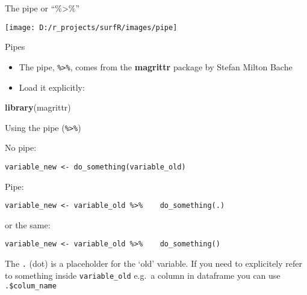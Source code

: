 \documentclass[ignorenonframetext,]{beamer}
\newenvironment{Shaded}{\begin{snugshade}}{\end{snugshade}}
\newcommand{\KeywordTok}[1]{\textcolor[rgb]{0.13,0.29,0.53}{\textbf{#1}}}
\newcommand{\NormalTok}[1]{#1}
\providecommand{\tightlist}{%
  \setlength{\itemsep}{0pt}\setlength{\parskip}{0pt}}
\begin{document}
\begin{frame}[fragile]{The pipe or ``\%\textgreater{}\%''}
\protect\hypertarget{the-pipe-or}{}

\begin{flushright}\texttt{[image: D:/r\_projects/surfR/images/pipe]} \end{flushright}

\begin{block}{Pipes}

\begin{itemize}
\tightlist
\item
  The pipe, \texttt{\%\textgreater{}\%}, comes from the
  \textbf{magrittr} package by Stefan Milton Bache
\item
  Load it explicitly:
\end{itemize}

\begin{Shaded}
\begin{Highlighting}[]
\KeywordTok{library}\NormalTok{(magrittr)}
\end{Highlighting}
\end{Shaded}

\end{block}

\begin{block}{Using the pipe (\texttt{\%\textgreater{}\%})}

No pipe:

\texttt{variable\_new\ \textless{}-\ do\_something(variable\_old)}

Pipe:

\texttt{variable\_new\ \textless{}-\ variable\_old\ \%\textgreater{}\%\ \ \ \ do\_something(.)}

or the same:

\texttt{variable\_new\ \textless{}-\ variable\_old\ \%\textgreater{}\%\ \ \ \ do\_something()}

The \texttt{.} (dot) is a placeholder for the `old' variable. If you
need to explicitely refer to something inside \texttt{variable\_old}
e.g.~a column in dataframe you can use \texttt{.\$colum\_name}

\end{block}

\end{frame}
\end{document}
